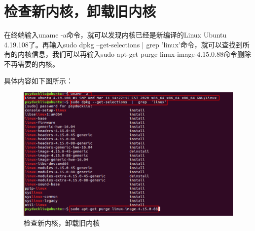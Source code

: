 \documentclass[11pt,a4paper]{article}
\begin{document}
	\section{检查新内核，卸载旧内核}
	在终端输入uname -a命令，就可以发现内核已经是新编译的Linux Ubuntu 4.19.108了。再输入sudo dpkg --get-selections | grep 'linux'命令，就可以查找到所有的内核信息，我们可以再输入sudo apt-get purge linux-image-4.15.0.88命令删除不再需要的内核。\par
	具体内容如下图所示：
	\newpage
	\begin{figure}[h]
		\centering
		\includegraphics[width=0.7\linewidth]{Pictures/24_WPS}
		\caption{检查新内核，卸载旧内核}
		\label{fig:24wps}
	\end{figure}
	
	
	
	
	
	
	
	
		
	
	
	
	
	
	
	
	
\end{document}
